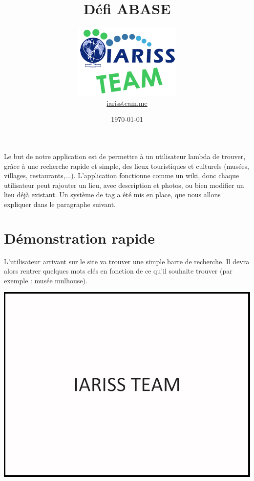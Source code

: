 \documentclass[12pt, a4paper]{article}
\title{Défi ABASE}
\newcommand{\espace}{\vspace{.8cm}}
\begin{document}
\author{\includegraphics{../_img/iariss_team.png} \\ {\sffamily \href{http://iarissteam.me}{iarissteam.me}}}
\date{\today}

\maketitle{}

{\sffamily Le but de notre application est de permettre à un utilisateur lambda de trouver, grâce à une recherche rapide et simple, des lieux touristiques et culturels (musées, villages, restaurants,...). L'application fonctionne comme un wiki, donc chaque utilisateur peut rajouter un lieu, avec description et photos, ou bien modifier un lieu déjà existant. Un système de tag a été mis en place, que nous allons expliquer dans le paragraphe suivant.} 

\espace{}
\section{Démonstration rapide}
L'utilisateur arrivant sur le site va trouver une simple barre de recherche. Il devra alors rentrer quelques mots clés en fonction de ce qu'il souhaite trouver (par exemple : \og{}musée mulhouse\fg{}).

\espace{}
\includegraphics[width=.9\textwidth, keepaspectratio=true]{img/test.png}
\end{document}

